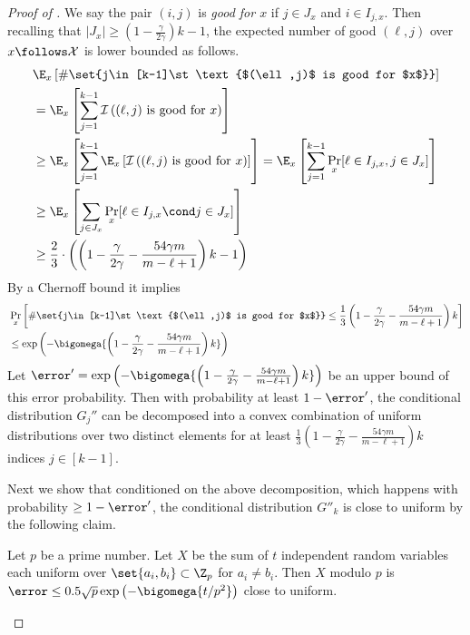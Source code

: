 \begin{proof}[Proof of ]
		We say the pair $(i,j)$ is \emph{good for $x$} if $j\in J_{x}$ and $i\in I_{j,x}$.
		Then recalling that $|J_x|\ge \left(1-\frac{\gamma}{2\gamma}\right)k-1$, the expected number of good $(\ell,j)$ over $x\follows\mathcal{X}$ is lower bounded as follows.
		\begin{align*}
			& \E_x\left[ \#\set{j\in [k-1]\st \text{$(\ell,j)$ is good for $x$}} \right]  \\
			&= \E_x\left[ \sum_{j=1}^{k-1} \mathcal{I}\left(\text{$(\ell,j)$ is good for $x$}\right) \right] \\
			&\ge  \E_x\left[ \sum_{j=1}^{k-1} \E_x\left[\mathcal{I}\left(\text{$(\ell,j)$ is good for $x$}\right)\right] \right] 
			= \E_x\left[ \sum_{j=1}^{k-1} \Pr_x[\ell \in I_{j,x}, j\in J_x] \right]\\
			&\ge  \E_x\left[ \sum_{j\in J_x} \Pr_x[\ell \in I_{j,x}\cond j\in J_x] \right] \\
			&\ge  \frac{2}{3}\cdot\left(\left(1-\frac{\gamma}{2\gamma}- \frac {54\gamma m}{m-\ell+1}\right)k-1\right)
		\end{align*}
		By a Chernoff bound it implies
		\begin{align*}
			& \Pr_x\left[ \#\set{j\in [k-1]\st \text{$(\ell,j)$ is good for $x$}} \le \frac{1}{3} \left(1-\frac{\gamma}{2\gamma} - \frac {54\gamma m}{m-\ell+1}\right)k \right]\\
		&\le \exp\left( -\bigomega{\left(1-\frac{\gamma}{2\gamma}- \frac {54\gamma m}{m-\ell+1}\right)k} \right)
		\end{align*}
		Let $\error' = \exp\left( -\bigomega{\left(1-\frac{\gamma}{2\gamma}- \frac {54\gamma m}{m-\ell+1}\right)k} \right)$ be an upper bound of this error probability.
		Then with probability at least $1-\error'$, the conditional distribution %
		$G_j''$ can be decomposed into a convex combination of uniform distributions over two distinct elements for at least $\frac{1}{3} \left(1-\frac{\gamma}{2\gamma}- \frac {54\gamma m}{m-\ell+1}\right)k$ indices $j\in [k-1]$.

		Next we show that conditioned on the above decomposition, 
		which happens with probability $\ge 1-\error'$,
		the conditional distribution $G''_k$ is close to uniform by the following claim.
		\begin{claim}
			Let $p$ be a prime number. 
			Let $X$ be the sum of $t$ independent random variables each uniform over $\set{a_i,b_i}\subset\Z_p$ for $a_i\ne b_i$.
			Then $X$ modulo $p$ is $\error\le 0.5\sqrt{p}\exp\left(-\bigomega{t/p^2} \right)$ close to uniform.
		\end{claim}
		

\end{proof}
